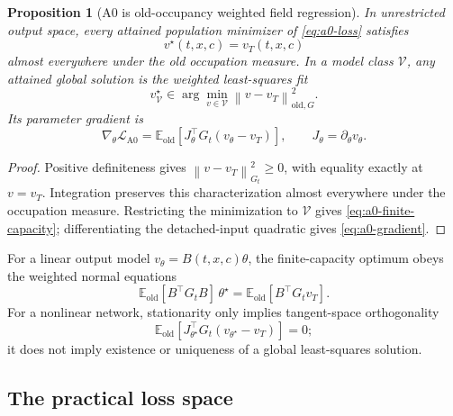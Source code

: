 \documentclass[11pt,a4paper]{article}
\newcommand{\E}{\mathbb{E}}
\newcommand{\norm}[1]{\left\lVert #1 \right\rVert}
\newcommand{\vT}{v_T}
\newcommand{\vtheta}{v_\theta}
\theoremstyle{plain}
\newtheorem{proposition}[theorem]{Proposition}
\theoremstyle{definition}
\begin{document}
\begin{proposition}[A0 is old-occupancy weighted field regression]
\label{prop:a0-projection}
In unrestricted output space, every attained population minimizer of \eqref{eq:a0-loss} satisfies
\begin{equation}
v^\star(t,x,c)=\vT(t,x,c)
\label{eq:a0-unrestricted}
\end{equation}
almost everywhere under the old occupation measure.  In a model class $\mathcal V$, any attained
global solution is the weighted least-squares fit
\begin{equation}
v_{\mathcal V}^\star
\in
\arg\min_{v\in\mathcal V}
\norm{v-\vT}_{\mathrm{old},G}^2 .
\label{eq:a0-finite-capacity}
\end{equation}
Its parameter gradient is
\begin{equation}
\nabla_\theta\mathcal L_{\mathrm{A0}}
=
\E_{\mathrm{old}}\!\left[
  J_\theta^\top G_t(\vtheta-\vT)
\right],
\qquad
J_\theta=\partial_\theta\vtheta .
\label{eq:a0-gradient}
\end{equation}
\end{proposition}

\begin{proof}
Positive definiteness gives
$\norm{v-\vT}_{G_t}^2\ge0$, with equality exactly at $v=\vT$.  Integration preserves this
characterization almost everywhere under the occupation measure.  Restricting the minimization
to $\mathcal V$ gives \eqref{eq:a0-finite-capacity}; differentiating the detached-input quadratic
gives \eqref{eq:a0-gradient}.
\end{proof}

For a linear output model $v_\theta=B(t,x,c)\theta$, the finite-capacity optimum obeys the weighted
normal equations
\begin{equation}
\E_{\mathrm{old}}[B^\top G_tB]\,\theta^\star
=
\E_{\mathrm{old}}[B^\top G_t\vT].
\label{eq:a0-normal-equations}
\end{equation}
For a nonlinear network, stationarity only implies tangent-space orthogonality
\begin{equation}
\E_{\mathrm{old}}\!\left[
  J_{\theta^\star}^{\top}G_t(v_{\theta^\star}-\vT)
\right]=0;
\label{eq:a0-tangent}
\end{equation}
it does not imply existence or uniqueness of a global least-squares solution.

\subsection{The practical loss space}
\end{document}
